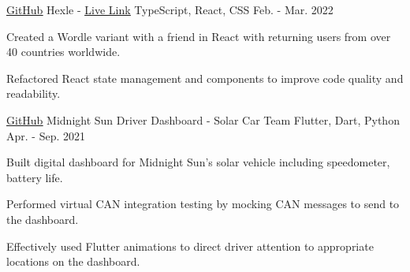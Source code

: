

\begin{cventries}

  \cventry
    {\href{https://github.com/frankljin/hexle/}{\underline{GitHub}}} %
    {Hexle - \href{https://frankljin.github.io/hexle/}{\underline{Live Link}}} %
    {TypeScript, React, CSS} %
    {Feb. - Mar. 2022} %
    {
      \begin{cvitems} %
        \item {Created a Wordle variant with a friend in React with returning users from over 40 countries worldwide.}
        \item {Refactored React state management and components to improve code quality and readability.}
      \end{cvitems}
    }

  \cventry
    {\href{https://github.com/uw-midsun/telemetry_xiv}{\underline{GitHub}}} %
    {Midnight Sun Driver Dashboard - Solar Car Team} %
    {Flutter, Dart, Python} %
    {Apr. - Sep. 2021} %
    {
      \begin{cvitems} %
        \item {Built digital dashboard for Midnight Sun's solar vehicle including speedometer, battery life.}
        \item {Performed virtual CAN integration testing by mocking CAN messages to send to the dashboard.}
        \item {Effectively used Flutter animations to direct driver attention to appropriate locations on the dashboard.}
      \end{cvitems}
    }



\end{cventries}
